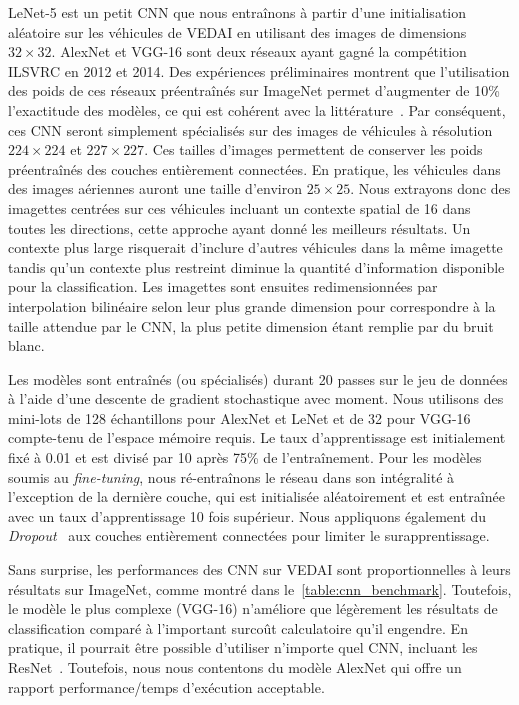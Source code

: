  LeNet-5 est un petit \gls{CNN} que nous entraînons à partir d'une initialisation aléatoire sur les véhicules de \gls{VEDAI} en utilisant des images de dimensions $32\times32$. \gls{AlexNet} et \gls{VGG-16} sont deux réseaux ayant gagné la compétition \gls{ILSVRC} en 2012 et 2014. Des expériences préliminaires montrent que l'utilisation des poids de ces réseaux préentraînés sur ImageNet permet d'augmenter de 10\% l'exactitude des modèles, ce qui est cohérent avec la littérature~\cite{nogueira_towards_2016,penatti_deep_2015}. Par conséquent, ces \gls{CNN} seront simplement spécialisés sur des images de véhicules à résolution $224 \times 224$ et $227 \times 227$.
 Ces tailles d'images permettent de conserver les poids préentraînés des couches entièrement connectées. En pratique, les véhicules dans des images aériennes auront une taille d'environ $25\times 25$. Nous extrayons donc des imagettes centrées sur ces véhicules incluant un contexte spatial de \SI{16}{\px} dans toutes les directions, cette approche ayant donné les meilleurs résultats. Un contexte plus large risquerait d'inclure d'autres véhicules dans la même imagette tandis qu'un contexte plus restreint diminue la quantité d'information disponible pour la classification. Les imagettes sont ensuites redimensionnées par interpolation bilinéaire selon leur plus grande dimension pour correspondre à la taille attendue par le \gls{CNN}, la plus petite dimension étant remplie par du bruit blanc.

Les modèles sont entraînés (ou spécialisés) durant 20 passes sur le jeu de données à l'aide d'une descente de gradient stochastique avec moment. Nous utilisons des mini-lots de 128 échantillons pour AlexNet et LeNet et de 32 pour VGG-16 compte-tenu de l'espace mémoire requis. Le taux d'apprentissage est initialement fixé à \num{0.01} et est divisé par 10 après 75\% de l'entraînement. Pour les modèles soumis au \emph{fine-tuning}, nous ré-entraînons le réseau dans son intégralité à l'exception de la dernière couche, qui est initialisée aléatoirement et est entraînée avec un taux d'apprentissage 10 fois supérieur. Nous appliquons également du \emph{Dropout}~\cite{srivastava_dropout_2014} aux couches entièrement connectées pour limiter le surapprentissage.

Sans surprise, les performances des \gls{CNN} sur \gls{VEDAI} sont proportionnelles à leurs résultats sur ImageNet, comme montré dans le~\cref{table:cnn_benchmark}. Toutefois, le modèle le plus complexe (VGG-16) n'améliore que légèrement les résultats de classification comparé à l'important surcoût calculatoire qu'il engendre. En pratique, il pourrait être possible d'utiliser n'importe quel \gls{CNN}, incluant les ResNet~\cite{he_deep_2016}. Toutefois, nous nous contentons du modèle AlexNet qui offre un rapport performance/temps d'exécution acceptable.

